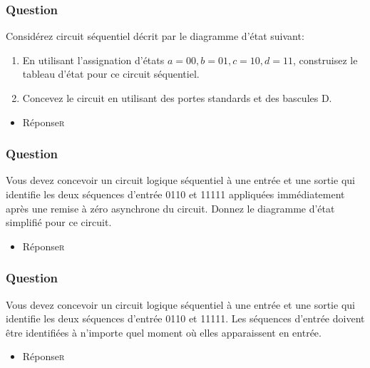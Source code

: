 \documentclass[11pt]{article}
\begin{document}
\subsubsection*{Question}
\label{sec:org9baea31}
Considérez circuit séquentiel décrit par le diagramme d'état suivant:
\begin{center}

\end{center}
\begin{enumerate}
\item En utilisant l'assignation d'états \(a = 00, b = 01, c = 10, d
         = 11\), construisez le tableau d'état pour ce circuit séquentiel.

\item Concevez le circuit en utilisant des portes standards et des
bascules D.
\end{enumerate}

\begin{itemize}
\item Réponse\hfill{}\textsc{r}
\label{sec:org6a1aa0c}
\end{itemize}

\subsubsection*{Question}
\label{sec:org6f49a0f}
Vous devez concevoir un circuit logique séquentiel à une entrée et
  une sortie qui identifie les deux séquences d'entrée 0110 et 11111
  appliquées immédiatement après une remise à zéro asynchrone du
  circuit. Donnez le diagramme d'état simplifié pour ce circuit.

\begin{itemize}
\item Réponse\hfill{}\textsc{r}
\label{sec:orgb6c339f}
\end{itemize}

\subsubsection*{Question}
\label{sec:org34a26c0}
Vous devez concevoir un circuit logique séquentiel à une entrée et
 une sortie qui identifie les deux séquences d'entrée 0110
 et 11111. Les séquences d'entrée doivent être identifiées à
 n'importe quel moment où elles apparaissent en entrée.

\begin{itemize}
\item Réponse\hfill{}\textsc{r}
\label{sec:org87e837f}
\end{itemize}
\end{document}
